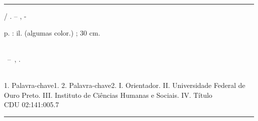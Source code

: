 \documentclass[
	12pt,				%
	openright,			%
	twoside,			%
	a4paper,			%
	english,			%
	brazil				%
	]{abntex2}
\begin{document}

\imprimirfolhaderosto*



%
%     
%
%
\begin{fichacatalografica}
	\vspace*{\fill}					%
	\hrule							%
	\begin{center}					%
	\begin{minipage}[c]{12.5cm}		%

	\imprimirautor

	\hspace{0.5cm} \imprimirtitulo  / \imprimirautor. --
	\imprimirlocal, \imprimirdata-

	\hspace{0.5cm}  p. : il. (algumas color.) ; 30 cm.\\

	\hspace{0.5cm} \imprimirorientadorRotulo~\imprimirorientador\\

	\hspace{0.5cm}
	\parbox[t]{\textwidth}{\imprimirtipotrabalho~--~\imprimirinstituicao,
	\imprimirdata.}\\

	\hspace{0.5cm}
		1. Palavra-chave1.
		2. Palavra-chave2.
		I. Orientador.
		II. Universidade Federal de Ouro Preto.
		III. Instituto de Ciências Humanas e Sociais.
		IV. Título\\

	\hspace{8.75cm} CDU 02:141:005.7\\

	\end{minipage}
	\end{center}
	\hrule
\end{fichacatalografica}
\end{document}
